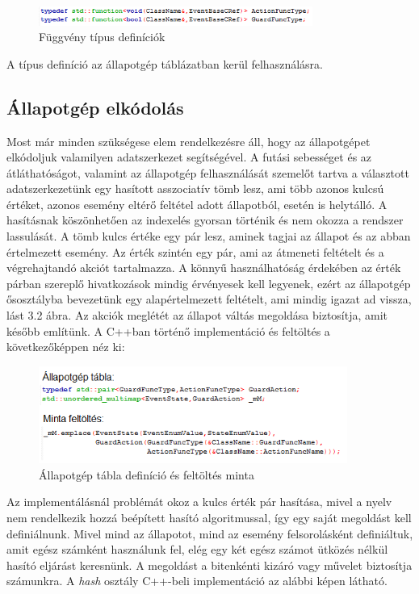 \documentclass[a4paper,12pt]{report}
\begin{document}
\begin{figure}[hbtp]
\centering
\includegraphics[width=0.8\textwidth]{ft.png}
\caption{Függvény típus definíciók}
\label{fig:ftbgd}
\end{figure}
A típus definíció az állapotgép táblázatban kerül felhasználásra.

\subsection{Állapotgép elkódolás}

Most már minden szükségese elem rendelkezésre áll, hogy az állapotgépet elkódoljuk valamilyen adatszerkezet segítségével. A futási sebességet és az átláthatóságot, valamint az állapotgép felhasználását szemelőt tartva a választott adatszerkezetünk egy hasított asszociatív tömb lesz, ami több azonos kulcsú értéket, azonos esemény eltérő feltétel adott állapotból, esetén is helytálló. A hasításnak köszönhetően az indexelés gyorsan történik és nem okozza a rendszer lassulását. A tömb kulcs értéke egy pár lesz, aminek tagjai az állapot és az abban értelmezett esemény. Az érték szintén egy pár, ami az átmeneti feltételt és a végrehajtandó akciót tartalmazza. A könnyű használhatóság érdekében az érték párban szereplő hivatkozások mindig érvényesek kell legyenek, ezért az állapotgép ősosztályba bevezetünk egy alapértelmezett feltételt, ami mindig igazat ad vissza, lást 3.2 ábra. Az akciók meglétét az állapot váltás megoldása biztosítja, amit később említünk. A C++ban történő implementáció és feltöltés a következőképpen néz ki:

\begin{figure}[hbtp]
\centering
\includegraphics[width=0.9\textwidth]{tbf.png}
\caption{Állapotgép tábla definíció és feltöltés minta}
\label{fig:atgdb}
\end{figure}


Az implementálásnál problémát okoz a kulcs érték pár hasítása, mivel a nyelv nem rendelkezik hozzá beépített hasító algoritmussal, így egy saját megoldást kell definiálnunk. Mivel mind az állapotot, mind az esemény felsorolásként definiáltuk, amit egész számként használunk fel, elég egy két egész számot ütközés nélkül hasító eljárást keresnünk. A megoldást a bitenkénti kizáró vagy művelet biztosítja számunkra. A {\it hash} osztály C++-beli implementáció az alábbi képen látható.
\end{document}
